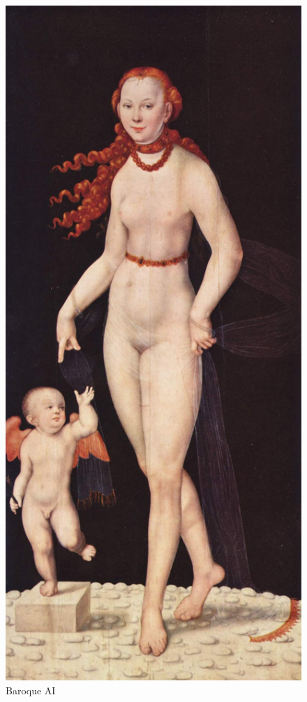 \documentclass[
  letterpaper,
]{book}
\begin{document}
\begin{figure}

{\centering \includegraphics{./6780765/Cupido.jpg}

}

\caption{Baroque AI}

\end{figure}
\end{document}

